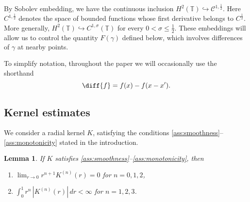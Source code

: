 \documentclass[a4paper]{amsart}
\newtheorem{lemma}[theorem]{Lemma}
\theoremstyle{definition}
\begin{document}
By Sobolev embedding, we have the continuous inclusion 
$H^2(\mathbb{T})\hookrightarrow \mathcal{C}^{1,\frac{1}{2}}.$ Here \(C^{1,\frac12}\) denotes the space of bounded functions whose first derivative
belongs to \(C^{\frac12}\). More generally, \(H^2(\mathbb T)\hookrightarrow
C^{1,\sigma}(\mathbb T)\) for every \(0<\sigma\le \frac12\). These embeddings will allow us to control the quantity \(F(\gamma)\) defined below, which involves differences of \(\gamma\) at nearby points.

To simplify notation, throughout the paper we will occasionally use the shorthand $$\diff{f} = f(x)-f(x-x').$$

\subsection{Kernel estimates}
We consider a radial kernel $K$, satisfying the conditions \ref{ass:smoothness}–\ref{ass:monotonicity} stated in the introduction. 

\begin{lemma} \label{lemma:intDerivades}
    If $K$ satisfies \ref{ass:smoothness}--\ref{ass:monotonicity}, then
    \begin{enumerate}
        \item $\displaystyle \lim_{r\to 0} r^{n+1}K^{(n)}(r)=0$ for $n=0,1,2$, \label{prop:Limits0}
        \item $\displaystyle \int_0^1 r^n\,|K^{(n)}(r)|\,dr < \infty$ for $n=1,2,3$. \label{prop:integrabilitatrK}
    \end{enumerate}
\end{lemma}



\end{document}
